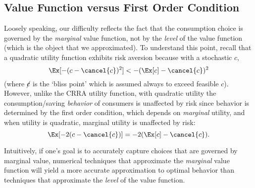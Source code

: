 \documentclass[\econtexRoot/SolvingMicroDSOPs]{subfiles}
\begin{document}
\hypertarget{value-function-versus-first-order-condition}{}
\subsection{Value Function versus First Order Condition}\label{subsec:vVsuP}

Loosely speaking, our difficulty reflects the fact that the
consumption choice is governed by the \textit{marginal} value function,
not by the \textit{level} of the value function (which is the object that
we approximated).  To understand this point, recall that a quadratic
utility function
 exhibits
risk aversion because with a stochastic ${c}$,
\begin{equation}
  \Ex[-({c} - \cancel{c})^{2}] < - (\Ex[{c}] - \cancel{c})^{2}
\end{equation}
(where $\cancel{c}$ is the `bliss point' which is assumed always to exceed feasible ${c}$). However, unlike the CRRA utility function,
with quadratic utility the consumption/saving \textit{behavior} of consumers
is unaffected by risk since behavior is determined by the first order condition, which
depends on \textit{marginal} utility, and when utility is quadratic, marginal utility is unaffected
by risk:
\begin{equation}
  \Ex[-2({c} - \cancel{c})] = - 2(\Ex[{c}] - \cancel{c}).
\end{equation}

Intuitively, if one's goal is to accurately capture choices
that are governed by marginal value,
numerical techniques that approximate the \textit{marginal} value
function will yield a more accurate approximation to
optimal behavior than techniques that approximate the \textit{level}
of the value function.
\end{document}
